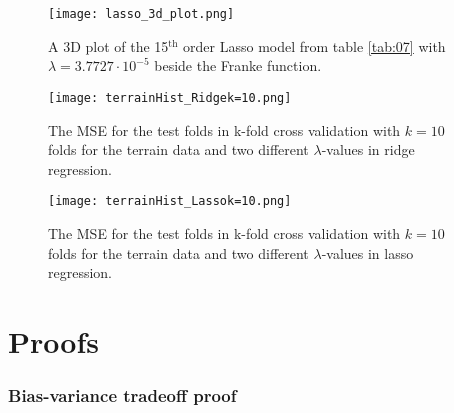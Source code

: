 \documentclass[uio,jmp,amsmath,amssymb,reprint,nofootinbib]{revtex4-1}
\numberwithin{equation}{section}
\begin{document}
\begin{figure}[H]
    \centering
    \texttt{[image: lasso\_3d\_plot.png]}
    \caption{A 3D plot of the 15\(^\text{th}\) order Lasso model from table \ref{tab:07} with \(\lambda = 3.7727\cdot 10^{-5}\) beside the Franke function.}
    \label{fig:lasso_3d}
\end{figure}


\begin{figure}[H]
    \centering
    \texttt{[image: terrainHist\_Ridgek=10.png]}
    \caption{The MSE for the test folds in k-fold cross validation with \(k=10\) folds for the terrain data and two different \(\lambda\)-values in ridge regression.}
    \label{fig:hist_terrain_ridge}
\end{figure}

\begin{figure}[H]
    \centering
    \texttt{[image: terrainHist\_Lassok=10.png]}
    \caption{The MSE for the test folds in k-fold cross validation with \(k=10\) folds for the terrain data and two different \(\lambda\)-values in lasso regression.}
    \label{fig:hist_terrain_lasso}
\end{figure}

\onecolumngrid
\section{Proofs}\label{sec:proof}

\subsubsection{Bias-variance tradeoff proof}
\end{document}
